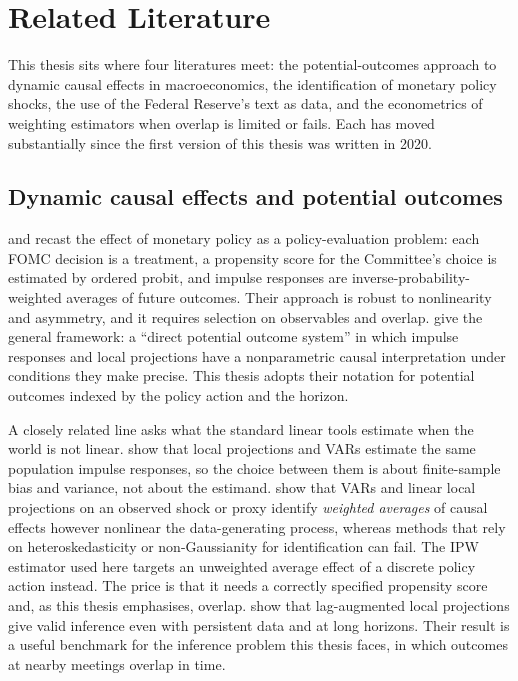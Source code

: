 \section{Related Literature}\label{sec:literature}

This thesis sits where four literatures meet: the potential-outcomes approach to dynamic causal effects in
macroeconomics, the identification of monetary policy shocks, the use of the Federal Reserve's text as data, and
the econometrics of weighting estimators when overlap is limited or fails. Each has moved substantially since the
first version of this thesis was written in 2020.

\subsection{Dynamic causal effects and potential outcomes}

\citet{angrist2011} and \citet{angrist2018} recast the effect of monetary policy as a policy-evaluation problem:
each FOMC decision is a treatment, a propensity score for the Committee's choice is estimated by ordered probit,
and impulse responses are inverse-probability-weighted averages of future outcomes. Their approach is robust to
nonlinearity and asymmetry, and it requires selection on observables and overlap. \citet{rambachan2025} give the
general framework: a ``direct potential outcome system'' in which impulse responses and local projections have a
nonparametric causal interpretation under conditions they make precise. This thesis adopts their notation for
potential outcomes indexed by the policy action and the horizon.

A closely related line asks what the standard linear tools estimate when the world is not linear.
\citet{plagborg2021} show that local projections and VARs estimate the same population impulse responses, so the
choice between them is about finite-sample bias and variance, not about the estimand. \citet{kolesar2025} show that
VARs and linear local projections on an observed shock or proxy identify \emph{weighted averages} of causal effects
however nonlinear the data-generating process, whereas methods that rely on heteroskedasticity or non-Gaussianity
for identification can fail. The IPW estimator used here targets an unweighted average effect of a discrete policy
action instead. The price is that it needs a correctly specified propensity score and, as this thesis emphasises,
overlap. \citet{montielolea2021} show that lag-augmented local projections give valid inference even with persistent
data and at long horizons. Their result is a useful benchmark for the inference problem this thesis faces, in which
outcomes at nearby meetings overlap in time.


